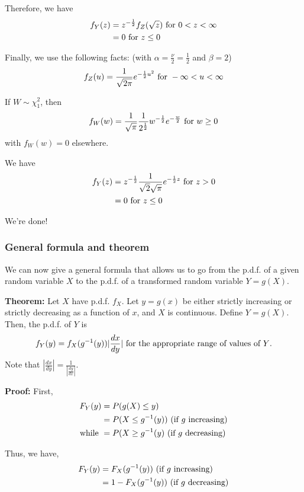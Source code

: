 \documentclass[12pt]{article}
\begin{document}
Therefore, we have
\begin{align*}
    f_Y (z) &= z^{-\frac{1}{2}} f_Z (\sqrt{z}) \textnormal{ for } 0 < z < \infty \\
        &= 0 \textnormal{ for } z \leq 0
\end{align*}

Finally, we use the following facts: (with $\alpha = \frac{\nu}{2} = \frac{1}{2}$ and $\beta = 2$)
\[
    f_Z (u) = \frac{1}{\sqrt{2\pi}} e^{-\frac{1}{2} u^2} \textnormal{ for } -\infty < u < \infty
\]

If $W \sim \chi_1^2$, then
\[
    f_W (w) = \frac{1}{\sqrt{\pi}} \frac{1}{2^{\frac{1}{2}}} w^{-\frac{1}{2}} e^{-\frac{w}{2}} \textnormal{ for } w \geq 0
\]
with $f_W (w) = 0$ elsewhere.

We have
\begin{align*}
    f_Y (z) &= z^{-\frac{1}{2}} \frac{1}{\sqrt{2} \sqrt{\pi}} e^{-\frac{1}{2} z} \textnormal{ for } z > 0 \\
        &= 0 \textnormal{ for } z \leq 0
\end{align*}

We're done!

\subsubsection{General formula and theorem}
We can now give a general formula that allows us to go from the p.d.f. of a given random variable $X$ to the p.d.f. of a transformed random variable $Y = g(X)$.

\textbf{Theorem:} Let $X$ have p.d.f. $f_X$. Let $y = g(x)$ be either strictly increasing or strictly decreasing as a function of $x$, and $X$ is continuous. Define $Y = g(X)$. Then, the p.d.f. of $Y$ is
\[
    f_Y (y) = f_X (g^{-1} (y)) |\frac{dx}{dy}| \textnormal{ for the appropriate range of values of $Y$.}
\]
Note that $\left|\frac{dx}{dy}\right| = \frac{1}{|\frac{dy}{dx}|}$.

\textbf{Proof:} First, 
\begin{align*}
    F_Y (y) &= P(g(X) \leq y) \\
        &= P(X \leq g^{-1}(y)) \textnormal{ (if $g$ increasing)} \\
    \textnormal{while } &= P(X \geq g^{-1}(y) \textnormal{ (if $g$ decreasing)}
\end{align*}

Thus, we have,
\begin{align*}
    F_Y (y) &= F_X (g^{-1} (y)) \textnormal{ (if $g$ increasing)} \\
        &= 1 - F_X (g^{-1} (y)) \textnormal{ (if $g$ decreasing)} 
\end{align*}
\end{document}

